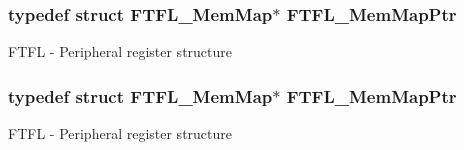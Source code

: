 \subsubsection[{\texorpdfstring{F\+T\+F\+L\+\_\+\+Mem\+Map\+Ptr}{FTFL_MemMapPtr}}]{\setlength{\rightskip}{0pt plus 5cm}typedef struct {\bf F\+T\+F\+L\+\_\+\+Mem\+Map}$\ast$ {\bf F\+T\+F\+L\+\_\+\+Mem\+Map\+Ptr}}\hypertarget{group___f_t_f_l___peripheral_ga7bcba0a1f0abf588061f4ab257e3fe48}{}\label{group___f_t_f_l___peripheral_ga7bcba0a1f0abf588061f4ab257e3fe48}
F\+T\+FL -\/ Peripheral register structure 
\subsubsection[{\texorpdfstring{F\+T\+F\+L\+\_\+\+Mem\+Map\+Ptr}{FTFL_MemMapPtr}}]{\setlength{\rightskip}{0pt plus 5cm}typedef struct {\bf F\+T\+F\+L\+\_\+\+Mem\+Map}$\ast$ {\bf F\+T\+F\+L\+\_\+\+Mem\+Map\+Ptr}}\hypertarget{group___f_t_f_l___peripheral_ga7bcba0a1f0abf588061f4ab257e3fe48}{}\label{group___f_t_f_l___peripheral_ga7bcba0a1f0abf588061f4ab257e3fe48}
F\+T\+FL -\/ Peripheral register structure 